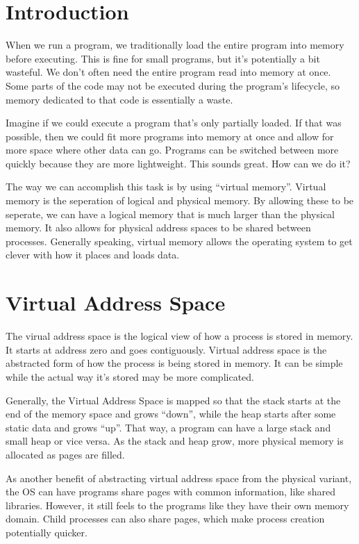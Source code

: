\documentclass{article}
\begin{document}
\maketitle
\tableofcontents

\section{Introduction}
When we run a program, we traditionally load the entire program into memory
before executing. This is fine for small programs, but it's potentially a bit
wasteful. We don't often need the entire program read into memory at once.
Some parts of the code may not be executed during the program's lifecycle, so
memory dedicated to that code is essentially a waste.

Imagine if we could execute a program that's only partially loaded. If that was
possible, then we could fit more programs into memory at once and allow for
more space where other data can go. Programs can be switched between more
quickly because they are more lightweight. This sounds great. How can we do it?

The way we can accomplish this task is by using ``virtual memory''. Virtual
memory is the seperation of logical and physical memory. By allowing these to
be seperate, we can have a logical memory that is much larger than the physical
memory. It also allows for physical address spaces to be shared between
processes. Generally speaking, virtual memory allows the operating system to
get clever with how it places and loads data.

\section{Virtual Address Space}
The virual address space is the logical view of how a process is stored in
memory. It starts at address zero and goes contiguously. Virtual address space
is the abstracted form of how the process is being stored in memory. It can be
simple while the actual way it's stored may be more complicated.

Generally, the Virtual Address Space is mapped so that the stack starts at the
end of the memory space and grows ``down'', while the heap starts after some
static data and grows ``up''. That way, a program can have a large stack and
small heap or vice versa. As the stack and heap grow, more physical memory is
allocated as pages are filled.

As another benefit of abstracting virtual address space from the physical
variant, the OS can have programs share pages with common information, like
shared libraries. However, it still feels to the programs like they have their
own memory domain. Child processes can also share pages, which make process
creation potentially quicker.
\end{document}
